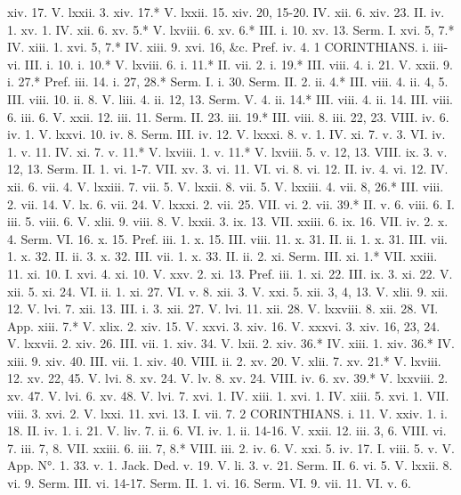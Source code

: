 xiv. 17.	V. lxxii. 3.
xiv. 17.*	V. lxxii. 15.
xiv. 20, 15-20.	IV. xii. 6.
xiv. 23.	II. iv. 1.
xv. 1.	IV. xii. 6.
xv. 5.*	V. lxviii. 6.
xv. 6.*	III. i. 10.
xv. 13.	Serm. I.
xvi. 5, 7.*	IV. xiii. 1.
xvi. 5, 7.*	IV. xiii. 9.
xvi. 16, &c.	Pref. iv. 4.
1 CORINTHIANS.
i. iii-vi.	III. i. 10.
i. 10.*	V. lxviii. 6.
i. 11.*	II. vii. 2.
i. 19.*	III. viii. 4.
i. 21.	V. xxii. 9.
i. 27.*	Pref. iii. 14.
i. 27, 28.*	Serm. I.
i. 30.	Serm. II. 2.
ii. 4.*	III. viii. 4.
ii. 4, 5.	III. viii. 10.
ii. 8.	V. liii. 4.
ii. 12, 13.	Serm. V. 4.
ii. 14.*	III. viii. 4.
ii. 14.	III. viii. 6.
iii. 6.	V. xxii. 12.
iii. 11.	Serm. II. 23.
iii. 19.*	III. viii. 8.
iii. 22, 23.	VIII. iv. 6.
iv. 1.	V. lxxvi. 10.
iv. 8.	Serm. III.
iv. 12.	V. lxxxi. 8.
v. 1.	IV. xi. 7.
v. 3.	VI. iv. 1.
v. 11.	IV. xi. 7.
v. 11.*	V. lxviii. 1.
v. 11.*	V. lxviii. 5.
v. 12, 13.	VIII. ix. 3.
v. 12, 13.	Serm. II. 1.
vi. 1-7.	VII. xv. 3.
vi. 11.	VI. vi. 8.
vi. 12.	II. iv. 4.
vi. 12.	IV. xii. 6.
vii. 4.	V. lxxiii. 7.
vii. 5.	V. lxxii. 8.
vii. 5.	V. lxxiii. 4.
vii. 8, 26.*	III. viii. 2.
vii. 14.	V. lx. 6.
vii. 24.	V. lxxxi. 2.
vii. 25.	VII. vi. 2.
vii. 39.*	II. v. 6.
viii. 6.	I. iii. 5.
viii. 6.	V. xlii. 9.
viii. 8.	V. lxxii. 3.
ix. 13.	VII. xxiii. 6.
ix. 16.	VII. iv. 2.
x. 4.	Serm. VI. 16.
x. 15.	Pref. iii. 1.
x. 15.	III. viii. 11.
x. 31.	II. ii. 1.
x. 31.	III. vii. 1.
x. 32.	II. ii. 3.
x. 32.	III. vii. 1.
x. 33.	II. ii. 2.
xi.	Serm. III.
xi. 1.*	VII. xxiii. 11.
xi. 10.	I. xvi. 4.
xi. 10.	V. xxv. 2.
xi. 13.	Pref. iii. 1.
xi. 22.	III. ix. 3.
xi. 22.	V. xii. 5.
xi. 24.	VI. ii. 1.
xi. 27.	VI. v. 8.
xii. 3.	V. xxi. 5.
xii. 3, 4, 13.	V. xlii. 9.
xii. 12.	V. lvi. 7.
xii. 13.	III. i. 3.
xii. 27.	V. lvi. 11.
xii. 28.	V. lxxviii. 8.
xii. 28.	VI. App.
xiii. 7.*	V. xlix. 2.
xiv. 15.	V. xxvi. 3.
xiv. 16.	V. xxxvi. 3.
xiv. 16, 23, 24.	V. lxxvii. 2.
xiv. 26.	III. vii. 1.
xiv. 34.	V. lxii. 2.
xiv. 36.*	IV. xiii. 1.
xiv. 36.*	IV. xiii. 9.
xiv. 40.	III. vii. 1.
xiv. 40.	VIII. ii. 2.
xv. 20.	V. xlii. 7.
xv. 21.*	V. lxviii. 12.
xv. 22, 45.	V. lvi. 8.
xv. 24.	V. lv. 8.
xv. 24.	VIII. iv. 6.
xv. 39.*	V. lxxviii. 2.
xv. 47.	V. lvi. 6.
xv. 48.	V. lvi. 7.
xvi. 1.	IV. xiii. 1.
xvi. 1.	IV. xiii. 5.
xvi. 1.	VII. viii. 3.
xvi. 2.	V. lxxi. 11.
xvi. 13.	I. vii. 7.
2 CORINTHIANS.
i. 11.	V. xxiv. 1.
i. 18.	II. iv. 1.
i. 21.	V. liv. 7.
ii. 6.	VI. iv. 1.
ii. 14-16.	V. xxii. 12.
iii. 3, 6.	VIII. vi. 7.
iii. 7, 8.	VII. xxiii. 6.
iii. 7, 8.*	VIII. iii. 2.
iv. 6.	V. xxi. 5.
iv. 17.	I. viii. 5.
v.	V. App. N°. 1. 33.
v. 1.	Jack. Ded.
v. 19.	V. li. 3.
v. 21.	Serm. II. 6.
vi. 5.	V. lxxii. 8.
vi. 9.	Serm. III.
vi. 14-17.	Serm. II. 1.
vi. 16.	Serm. VI. 9.
vii. 11.	VI. v. 6.
